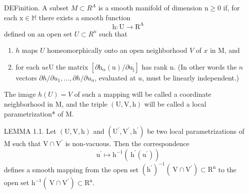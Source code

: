 \documentclass[10pt]{article}
\begin{document}
DEFinition. A subset $M \subset R^{A}$ is a smooth manifold of dimension $\mathrm{n} \geq 0$ if, for each $\mathrm{x} \in \mathbb{M}$ there exists a smooth function
$$
\mathrm{h}: \mathrm{U} \rightarrow \mathrm{R}^{\mathrm{A}}
$$
defined on an open set $U \subset R^{n}$ such that

\begin{enumerate}
  \item $h$ maps $U$ homeomorphically onto an open neighborhood $V$ of $x$ in $\mathrm{M}$, and

  \item for each $u \epsilon \mathrm{U}$ the matrix $\left[\partial \mathrm{h}_{\alpha}(\mathrm{u}) / \partial \mathrm{u}_{\mathrm{j}}\right]$ has rank $\mathrm{n}$. (In other words the $n$ vectors $\partial h / \partial u_{1}, \ldots, \partial h / \partial u_{n}$, evaluated at $u$, must be linearly independent.)

\end{enumerate}
The image $h(U)=V$ of such a mapping will be called a coordinate neighborhood in $\mathrm{M}$, and the triple $(\mathrm{U}, \mathrm{V}, \mathrm{h})$ will be called a local parametrization* of $\mathrm{M}$.

LEMMA 1.1. Let $(\mathrm{U}, \mathrm{V}, \mathrm{h})$ and $\left(\mathrm{U}^{\prime}, \mathrm{V}^{\prime}, \mathrm{h}^{\prime}\right)$ be two local parametrizations of $\mathrm{M}$ such that $\mathrm{V} \cap \mathrm{V}^{\prime}$ is non-vacuous. Then the correspondence
$$
\mathrm{u}^{\prime} \mapsto \mathrm{h}^{-1}\left(\mathrm{~h}^{\prime}\left(\mathrm{u}^{\prime}\right)\right)
$$
defines a smooth mapping from the open set $\left(\mathrm{h}^{\prime}\right)^{-1}\left(\mathrm{~V} \cap \mathrm{V}^{\prime}\right) \subset \mathrm{R}^{\mathrm{n}}$ to the open set $\mathrm{h}^{-1}\left(\mathrm{~V} \cap \mathrm{V}^{\prime}\right) \subset \mathrm{R}^{\mathrm{n}}$.
\end{document}
